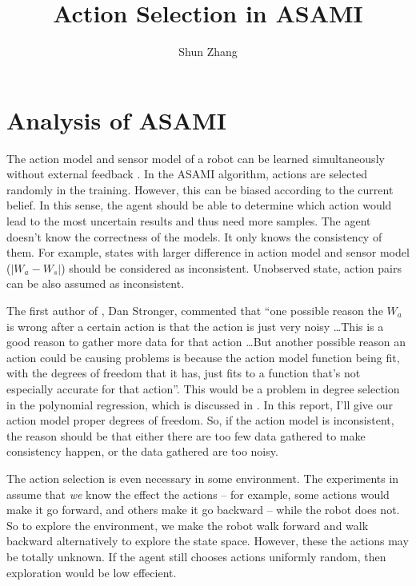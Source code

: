 \documentclass[10pt]{IEEEtran}
\title{Action Selection in ASAMI}
\author{Shun Zhang}
\date{}
\begin{document}
\maketitle


\section{Analysis of ASAMI}

The action model and sensor model of a robot can be learned
simultaneously without external feedback \cite{CSJ06}.  In the ASAMI
algorithm, actions are selected randomly in the training. However,
this can be biased according to the current belief.  In this sense,
the agent should be able to determine which action would lead to the
most uncertain results and thus need more samples.  The agent doesn't
know the correctness of the models. It only knows the consistency of
them. For example, states with larger difference in action model and
sensor model ($|W_a - W_s|$) should be considered as inconsistent.
Unobserved state, action pairs can be also assumed as inconsistent.

The first author of \cite{CSJ06}, Dan Stronger, commented that ``one
possible reason the $W_a$ is wrong after a certain action is that the
action is just very noisy \ldots This is a good reason to gather more
data for that action \ldots  But another possible reason  an action
could be causing problems is because the action model function being
fit, with the degrees of freedom that it has, just fits to a function
that's not especially accurate for that action''. This would be a
problem in degree selection in the polynomial regression, which is
discussed in \cite{IJAIT08-stronger}. In this report, I'll give our
action model proper degrees of freedom. So, if the action model is
inconsistent, the reason should be that either there are too few data
gathered to make consistency happen, or the data gathered are too
noisy.

\hfill

The action selection is even necessary in some environment. The
experiments in \cite{CSJ06} assume that \textit{we} know the effect
the actions -- for example, some actions would make it go forward, and
others make it go backward -- while the robot does not. So to explore
the environment, we make the robot walk forward and walk backward
alternatively to explore the state space. However, these the actions
may be totally unknown.  If the agent still chooses actions uniformly
random, then exploration would be low effecient.
\end{document}
